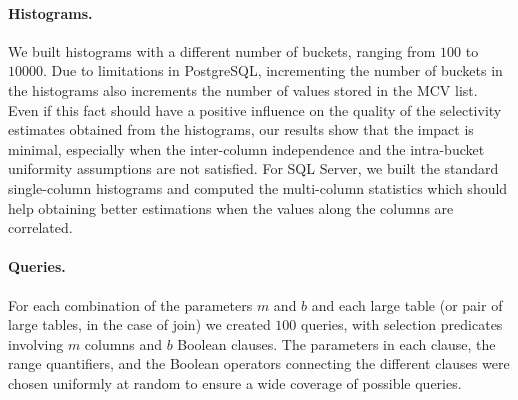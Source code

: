 
\paragraph{Histograms.} We built histograms with a different number of buckets,
ranging from $100$ to $10000$. Due to limitations in PostgreSQL, incrementing
the number of buckets in the histograms also increments the number of values
stored in the MCV list. Even if this fact should have a positive influence on
the quality of the selectivity estimates obtained from the histograms, our
results show that the impact is minimal, especially when the inter-column
independence and the intra-bucket uniformity assumptions are not satisfied.
For SQL Server, we built the standard single-column histograms and
computed the multi-column statistics which should help obtaining better
estimations when the values along the columns are correlated.

\paragraph{Queries.} 
For each combination of the parameters $m$ and $b$ and each large table (or pair
of large tables, in the case of join) we created $100$ queries, with selection
predicates involving $m$ columns and $b$ Boolean clauses. The parameters in each
clause, the range quantifiers, and the Boolean operators connecting the
different clauses were chosen uniformly at random to ensure a wide coverage of
possible queries.

